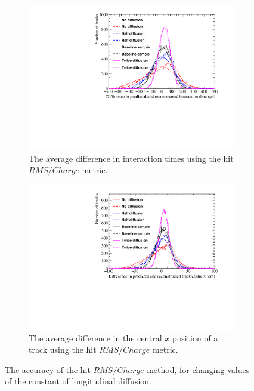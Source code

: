 \begin{figure}[h!]
  \centering
  \begin{subfigure}{0.6\textwidth}
    \centering
    \includegraphics[width=\textwidth]{Canvas_AvDiff_T_RMS_Q_Diffusion}
    \caption{The average difference in interaction times using the hit $RMS/Charge$ metric.}
    \label{fig:DiffLDiff_AvDiff_RMS_Int_T}
  \end{subfigure}
  \begin{subfigure}{0.6\textwidth}
    \centering
    \includegraphics[width=\textwidth]{Canvas_AvDiff_X_RMS_Q_Diffusion}
    \caption{The average difference in the central $x$ position of a track using the hit $RMS/Charge$ metric.}
    \label{fig:DiffLDiff_AvDiff_RMS_Int_X}
  \end{subfigure}
  \caption[Comparing the accuracy of the hit $RMS$ method, as the constant of longitudinal diffusion changes]
          {The accuracy of the hit $RMS/Charge$ method, for changing values of the constant of longitudinal diffusion. }
  \label{fig:DiffLDiff_AvDiff_RMS_Int}
\end{figure}

